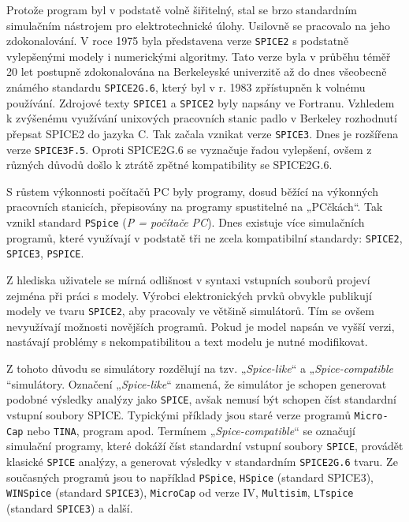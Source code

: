       Protože program byl v podstatě volně šiřitelný, stal se brzo standardním simulačním nástrojem
      pro elektrotechnické úlohy. Usilovně se pracovalo na jeho zdokonalování. V roce 1975 byla
      představena verze \texttt{SPICE2} s podstatně vylepšenými modely i numerickými algoritmy. Tato
      verze byla v průběhu téměř 20 let postupně zdokonalována na Berkeleyské univerzitě až do dnes
      všeobecně známého standardu \texttt{SPICE2G.6}, který byl v r. 1983 zpřístupněn k volnému
      používání. Zdrojové texty \texttt{SPICE1} a \texttt{SPICE2} byly napsány ve Fortranu. Vzhledem
      k zvýšenému využívání unixových pracovních stanic padlo v Berkeley rozhodnutí přepsat SPICE2
      do jazyka C. Tak začala vznikat verze \texttt{SPICE3}. Dnes je rozšířena verze
      \texttt{SPICE3F.5}. Oproti SPICE2G.6 se vyznačuje řadou vylepšení, ovšem z různých důvodů
      došlo k ztrátě zpětné kompatibility se SPICE2G.6. \cite[s.~2]{KolkaBiolek2011}

      S růstem výkonnosti počítačů PC byly programy, dosud běžící na výkonných pracovních stanicích,
      přepisovány na programy spustitelné na „PCčkách“. Tak vznikl standard \texttt{PSpice} (\emph{P
      = počítače PC}). Dnes existuje více simulačních programů, které využívají v podstatě tři ne
      zcela kompatibilní standardy: \texttt{SPICE2}, \texttt{SPICE3}, \texttt{PSPICE}. 
      
      Z hlediska uživatele se mírná odlišnost v syntaxi vstupních souborů projeví zejména při práci
      s modely. Výrobci elektronických prvků obvykle publikují modely ve tvaru \texttt{SPICE2}, aby
      pracovaly ve většině simulátorů. Tím se ovšem nevyužívají možnosti novějších programů. Pokud
      je model napsán ve vyšší verzi, nastávají problémy s nekompatibilitou a text modelu je nutné
      modifikovat.
      
      Z tohoto důvodu se simulátory rozdělují na tzv. „\emph{Spice-like}“ a „\emph{Spice-compatible}
      “simulátory. Označení „\emph{Spice-like}“ znamená, že simulátor je schopen generovat podobné
      výsledky analýzy jako \texttt{SPICE}, avšak nemusí být schopen číst standardní vstupní soubory
      SPICE. Typickými příklady jsou staré verze programů \texttt{Micro-Cap} nebo \texttt{TINA},
      program apod. Termínem „\emph{Spice-compatible}“ se označují simulační programy, které dokáží
      číst standardní vstupní soubory \texttt{SPICE}, provádět klasické \texttt{SPICE} analýzy, a
      generovat výsledky v standardním \texttt{SPICE2G.6} tvaru. Ze současných programů jsou to
      například \texttt{PSpice}, \texttt{HSpice} (standard SPICE3), \texttt{WINSpice} (standard
      \texttt{SPICE3}), \texttt{MicroCap} od verze IV, \texttt{Multisim}, \texttt{LTspice} (standard
      \texttt{SPICE3}) a další.

